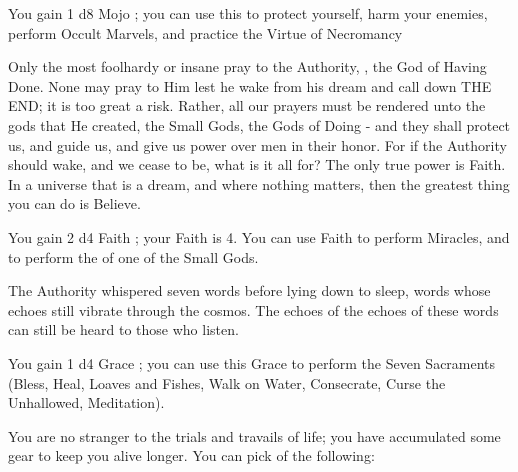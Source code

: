 {    You gain 1 d8 Mojo \UD; you can use this \UD to protect yourself, harm your enemies, perform Occult Marvels, and practice the Virtue of Necromancy\footnotemark[\value{footnote}]

  
    Only the most foolhardy or insane pray to the Authority, \TheAuthority, the God of Having Done.  None may pray to Him lest he wake from his dream and call down THE END; it is too great a risk. Rather, all our prayers must be rendered unto  the gods that He created, the Small Gods, the Gods of Doing - and they shall protect us, and guide us, and give us power over men in their honor.  For if the Authority should wake, and we cease to be, what is it all for?  The only true power is Faith.  In a universe that is a dream, and where nothing matters, then the greatest thing you can do is Believe.

    You gain 2 d4 Faith \POOL; your \MAX Faith is 4. You can use Faith to perform Miracles, and to perform the  of one of the Small Gods.\footnotemark[\value{footnote}]



    The Authority whispered seven words before lying down to sleep, words whose echoes still vibrate through the cosmos.  The echoes of the echoes of these words can still be heard to those who listen.  

    You gain 1 d4 Grace \UD; you can use this Grace to perform the Seven Sacraments (Bless, Heal, Loaves and Fishes, Walk on Water, Consecrate, Curse the Unhallowed, Meditation).\footnotemark[\value{footnote}]



    You are no stranger to the trials and travails of life; you have accumulated some gear to keep you alive longer.  You can pick  of the following:



}
